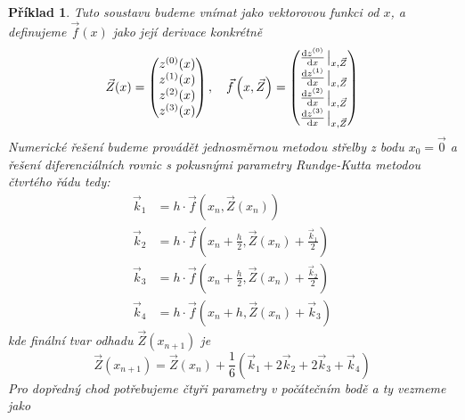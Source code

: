 \documentclass{article}
\newtheorem{example}{Příklad}
\begin{document}
\begin{example}
    Tuto soustavu budeme vnímat jako vektorovou funkci od $x$, a definujeme $\vec{f}(x)$ jako její derivace konkrétně 
    \begin{equation}
        \vec{Z}(x) = 
            \begin{pmatrix}
                z^{(0)}(x) \\ 
                z^{(1)}(x) \\
                z^{(2)}(x) \\
                z^{(3)}(x) \\ 
            \end{pmatrix} \qcomma 
        \vec{f}\left(x,\vec{Z}\right) = 
            \begin{pmatrix}
                \dv{z^{(0)}}{x}\eval_{x,\vec{Z}}\\
                \dv{z^{(1)}}{x}\eval_{x,\vec{Z}}\\
                \dv{z^{(2)}}{x}\eval_{x,\vec{Z}}\\
                \dv{z^{(3)}}{x}\eval_{x,\vec{Z}}\\
            \end{pmatrix} 
    \end{equation}
    Numerické řešení budeme provádět jednosměrnou metodou střelby z bodu $x_{0} = \vec{0}$ a řešení diferenciálních rovnic s pokusnými parametry Rundge-Kutta metodou čtvrtého řádu tedy:
    \begin{equation}
        \begin{aligned}
            \vec{k}_{1} &= h \cdot \vec{f}\left(  x_{n}, \vec{Z}(x_{n}) \right) \\ 
            \vec{k}_{2} &= h \cdot \vec{f}\left(  x_{n} + \frac{h}{2}, \vec{Z}(x_{n}) + \frac{\vec{k}_{1}}{2} \right) \\
            \vec{k}_{3} &= h \cdot \vec{f}\left( x_{n} + \frac{h}{2}, \vec{Z}(x_{n}) + \frac{\vec{k}_{2}}{2}  \right) \\
            \vec{k}_{4} &= h \cdot \vec{f}\left( x_{n} + h, \vec{Z}(x_{n}) + \vec{k}_{3}  \right)
        \end{aligned}
    \end{equation}
    kde finální tvar odhadu $\vec{Z}(x_{n+1})$ je
    \begin{equation}
\vec{Z}(x_{n+1}) = \vec{Z}(x_{n}) + \frac{1}{6}  \left(\vec{k}_{1} +  2\vec{k}_{2} + 2\vec{k}_{3} + \vec{k}_{4} \right)
    \end{equation}
    Pro dopředný chod potřebujeme čtyři parametry v počátečním bodě a ty vezmeme jako
    \begin{equation}

\end{equation}
\end{example}
\end{document}

